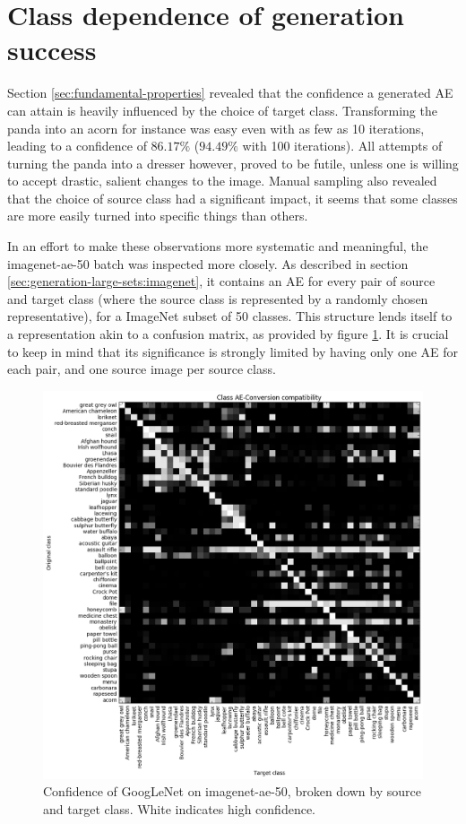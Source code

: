 \documentclass[11pt, a4paper]{article}
\begin{document}
\section{Class dependence of generation success}
Section \ref{sec:fundamental-properties} revealed that the confidence a generated AE can attain is heavily influenced by the choice of target class. Transforming the panda into an acorn for instance was easy even with as few as 10 iterations, leading to a confidence of $86.17\%$ ($94.49\%$ with 100 iterations). All attempts of turning the panda into a dresser however, proved to be futile, unless one is willing to accept drastic, salient changes to the image. Manual sampling also revealed that the choice of source class had a significant impact, it seems that some classes are more easily turned into specific things than others.

In an effort to make these observations more systematic and meaningful, the imagenet-ae-50 batch was inspected more closely. As described in section \ref{sec:generation-large-sets:imagenet}, it contains an AE for every pair of source and target class (where the source class is represented by a randomly chosen representative), for a ImageNet subset of 50 classes. This structure lends itself to a representation akin to a confusion matrix, as provided by figure \ref{fig:imagenet-ae-50-confusion-matrix}. It is crucial to keep in mind that its significance is strongly limited by having only one AE for each pair, and one source image per source class.

\begin{figure}[h!tb]
	\centering
	\includegraphics[width=\textwidth]{images/confusion-matrices/imagenet-ae-50.png}
	\caption{Confidence of GoogLeNet on imagenet-ae-50, broken down by source and target class. White indicates high confidence.}
	\label{fig:imagenet-ae-50-confusion-matrix}
\end{figure}
\end{document}
